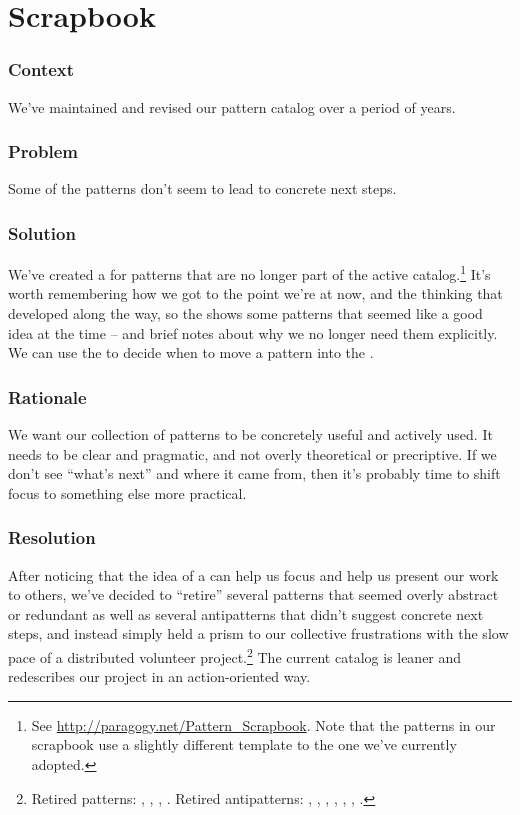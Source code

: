 \section{Scrapbook} \label{sec:Scrapbook}

\subsubsection*{Context} We've maintained and revised our pattern catalog over a period of years.

\subsubsection*{Problem} Some of the patterns don't seem to lead to concrete next steps.

\subsubsection*{Solution} We've created a  for patterns that are no longer part of the active catalog.\footnote{See \url{http://paragogy.net/Pattern_Scrapbook}.  Note that the patterns in our scrapbook use a slightly different template to the one we've currently adopted.}  It's worth remembering how we got to the point we're at now, and the thinking that developed along the way, so the  shows some patterns that seemed like a good idea at the time -- and brief notes about why we no longer need them explicitly.  We can use the  to decide when to move a pattern into the .

\subsubsection*{Rationale} We want our collection of patterns to be concretely useful and actively used.  It needs to be clear and pragmatic, and not overly theoretical or precriptive.  If we don't see ``what's next'' and where it came from, then it's probably time to shift focus to something else more practical.

\subsubsection*{Resolution}  After noticing that the idea of a  can help us focus and help us present our work to others, we've decided to ``retire'' several patterns that seemed overly abstract or redundant as well as several antipatterns that didn't suggest concrete next steps, and instead simply held a prism to our collective frustrations with the slow pace of a distributed volunteer project.\footnote{Retired patterns: , , , . Retired antipatterns: , , , , , , .}  The current catalog is leaner and redescribes our project in an action-oriented way. 


